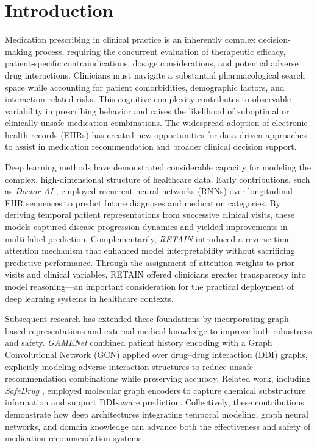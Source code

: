 \section{Introduction}
Medication prescribing in clinical practice is an inherently complex decision-making process, requiring the concurrent evaluation of therapeutic efficacy, patient-specific contraindications, dosage considerations, and potential adverse drug interactions. Clinicians must navigate a substantial pharmacological search space while accounting for patient comorbidities, demographic factors, and interaction-related risks. This cognitive complexity contributes to observable variability in prescribing behavior and raises the likelihood of suboptimal or clinically unsafe medication combinations. The widespread adoption of electronic health records (EHRs) has created new opportunities for data-driven approaches to assist in medication recommendation and broader clinical decision support.

Deep learning methods have demonstrated considerable capacity for modeling the complex, high-dimensional structure of healthcare data. Early contributions, such as \textit{Doctor AI} \cite{choi2016doctorai}, employed recurrent neural networks (RNNs) over longitudinal EHR sequences to predict future diagnoses and medication categories. By deriving temporal patient representations from successive clinical visits, these models captured disease progression dynamics and yielded improvements in multi-label prediction. Complementarily, \textit{RETAIN} \cite{choi2016retain} introduced a reverse-time attention mechanism that enhanced model interpretability without sacrificing predictive performance. Through the assignment of attention weights to prior visits and clinical variables, RETAIN offered clinicians greater transparency into model reasoning---an important consideration for the practical deployment of deep learning systems in healthcare contexts.

Subsequent research has extended these foundations by incorporating graph-based representations and external medical knowledge to improve both robustness and safety. \textit{GAMENet} \cite{shang2019gamenet} combined patient history encoding with a Graph Convolutional Network (GCN) applied over drug--drug interaction (DDI) graphs, explicitly modeling adverse interaction structures to reduce unsafe recommendation combinations while preserving accuracy. Related work, including \textit{SafeDrug} \cite{lee2021safedrug}, employed molecular graph encoders to capture chemical substructure information and support DDI-aware prediction. Collectively, these contributions demonstrate how deep architectures integrating temporal modeling, graph neural networks, and domain knowledge can advance both the effectiveness and safety of medication recommendation systems.

